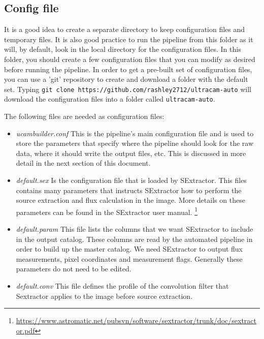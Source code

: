 \subsection{Config file}
It is a good idea to create a separate directory to keep configuration files and temporary files. It is also good practice to run the pipeline from this folder as it will, by default, look in the local directory for the configuration files. In this folder, you should create a few configuration files that you can modify as desired before running the pipeline. In order to get a pre-built set of configuration files, you can use a 'git' repository to create and download a folder with the default set. Typing \texttt{git clone https://github.com/rashley2712/ultracam-auto} will download the configuration files into a folder called \texttt{ultracam-auto}. 

The following files are needed as configuration files: 
\begin{itemize}
  \item \emph{ucambuilder.conf} This is the pipeline's main configuration file and is used to store the parameters that specify where the pipeline should look for the raw data, where it should write the output files, etc. This is discussed in more detail in the next section of this document. 
  \item \emph{default.sex} Is the configuration file that is loaded by {SExtractor}.  This files contains many parameters that instructs {SExtractor} how to perform the source extraction and flux calculation in the image. More details on these parameters can be found in the {SExtractor} user manual. \footnote{\url{https://www.astromatic.net/pubsvn/software/sextractor/trunk/doc/sextractor.pdf}}
  \item \emph{default.param} This file lists the columns that we want {SExtractor} to include in the output catalog. These columns are read by the automated pipeline in order to build up the master catalog. We need {SExtractor} to output flux measurements, pixel coordinates and measurement flags. Generally these parameters do not need to be edited. 
  \item \emph{default.conv} This file defines the profile of the convolution filter that {Sextractor} applies to the image before source extraction. 
\end{itemize}

